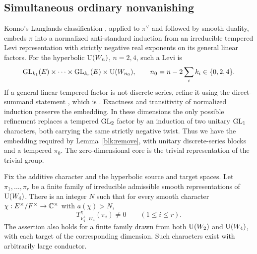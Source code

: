 \subsection{Simultaneous ordinary nonvanishing}
\label{cov:ordinary-section}

Konno's Langlands classification
\cite[Theorem~3.5 and Corollary~3.2]{Konno03}, applied to $\pi^\vee$
and followed by smooth duality, embeds $\pi$ into a normalized
anti-standard induction from an irreducible tempered Levi representation
with strictly negative real exponents on its general linear factors.
For the hyperbolic $\operatorname{U}(W_n)$, $n=2,4$, such a Levi is
\[
 \operatorname{GL}_{k_1}(E)\times\cdots\times\operatorname{GL}_{k_r}(E)
                  \times\operatorname{U}(W_{n_0}),\qquad
 n_0=n-2\sum_i k_i\in\{0,2,4\}.
\]
If a general linear tempered factor is not discrete series, refine it
using the direct-summand statement
\cite[Proposition 2.2]{Konno03}, which is
\cite[Proposition III.4.1]{Waldspurger03}. Exactness and transitivity of
normalized induction preserve the embedding. In these dimensions the
only possible refinement replaces a tempered $\operatorname{GL}_2$ factor by an
induction of two unitary $\operatorname{GL}_1$ characters, both carrying the same
strictly negative twist. Thus we have the embedding required by
Lemma~\ref{blk:remove}, with unitary discrete-series blocks and a
tempered $\pi_0$. The zero-dimensional core is the trivial representation of the trivial
group.

\begin{theorem}
\label{cov:ordinary}
Fix the additive character and the hyperbolic source and target spaces.
Let $\pi_1,\ldots,\pi_r$ be a finite family of irreducible admissible
smooth representations of $\operatorname{U}(W_4)$. There is an integer $N$ such that
for every smooth character $\chi:E^\times/F^\times\to\mathbb C^\times$ with
$a(\chi)>N$,
\[
 T^{\chi}_{V_4^+,W_4}(\pi_i)\ne0
             \qquad(1\le i\le r).
\]
The assertion also holds for a finite family drawn from both
$\operatorname{U}(W_2)$ and $\operatorname{U}(W_4)$, with each target of the corresponding dimension.
Such characters exist with arbitrarily large conductor.
\end{theorem}

